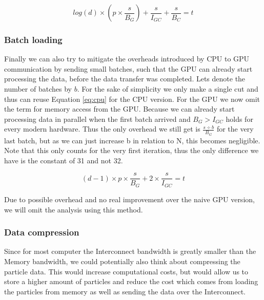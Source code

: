 \documentclass[]{article}
\begin{document}
\begin{center}
	\begin{equation}
		log(d) \times \left ( p \times \frac{s}{B_{G}} \right ) + \frac{s}{I_{GC}} + \frac{s}{B_{C}} = t
		\label{eq:gputree}
	\end{equation}
\end{center}


\subsubsection{Batch loading}

Finally we can also try to mitigate the overheads introduced by CPU to GPU communication by sending small batches, such that the GPU can already start processing the data, before the data transfer was completed. Lets denote the number of batches by $b$. For the sake of simplicity we only make a single cut and thus can reuse Equation \ref{eq:cpu} for the CPU version. For the GPU we now omit the term for memory access from the GPU. Because we can already start processing data in parallel when the first batch arrived and $B_{G} > I_{GC}$ holds for every modern hardware. Thus the only overhead we still get is $\frac{s \div b}{B_{G}}$ for the very last batch, but as we can just increase b in relation to N, this becomes negligible. Note that this only counts for the very first iteration, thus the only difference we have is the constant of 31 and not 32. 

\begin{center}
	\begin{equation}
		(d-1) \times p \times \frac{s}{B_{G}} + 2 \times \frac{s}{I_{GC}} = t
		\label{eq:gpubatch}
	\end{equation}
\end{center}

Due to possible overhead and no real improvement over the naive GPU version, we will omit the analysis using this method.

\subsubsection{Data compression}

Since for most computer the Interconnect bandwidth is greatly smaller than the Memory bandwidth, we could potentially also think about compressing the particle data. This would increase computational costs, but would allow us to store a higher amount of particles and reduce the cost which comes from loading the particles from memory as well as sending the data over the Interconnect.
\end{document}
